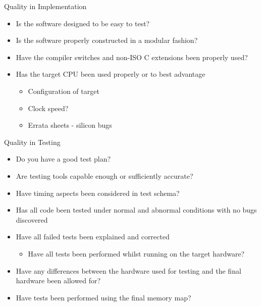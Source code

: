 \documentclass{beamer}
\begin{document}
\begin{frame}{Quality in Implementation}
  \begin{itemize}
  \item Is the software designed to be easy to test?
  \item Is the software properly constructed in a modular fashion?
  \item Have the compiler switches and non-ISO C extensions been
    properly used?
  \item Has the target CPU been used properly or to best advantage
    \begin{itemize}
    \item Configuration of target
    \item Clock speed?
    \item Errata sheets - silicon bugs
    \end{itemize}
  \end{itemize}
\end{frame}

\begin{frame}{Quality in Testing}
  \begin{itemize}
    \item Do you have a good test plan?
  \item Are testing tools capable enough or sufficiently
    accurate?
  \item Have timing aspects been considered in test schema?
  \item Has all code been tested under normal and abnormal conditions
    with no bugs discovered
  \item Have all failed tests been explained and corrected
    \begin{itemize}
    \item Have all tests been performed whilst running on the
      target hardware?
    \end{itemize}
  \item Have any differences between the hardware used for testing and
    the final hardware been allowed for?
  \item Have tests been performed using the final memory map?
  \end{itemize}
\end{frame}
\end{document}
